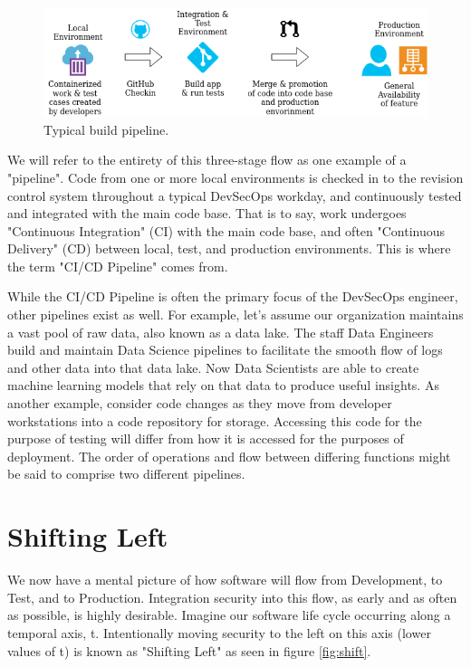 \begin{figure}[!htb]
	\centering
	\includegraphics[scale=0.63]{../images/flow.png}
	\caption{Typical build pipeline.}
	\label{fig:pipeline}
\end{figure}

\justify
We will refer to the entirety of this three-stage flow as one example of
a "pipeline". Code from one or more local environments is checked in to
the revision control system throughout a typical DevSecOps workday, and
continuously tested and integrated with the main code base. That is to
say, work undergoes "Continuous Integration" (CI) with the main code base, and often "Continuous Delivery" (CD) between local, test, and production environments. This is where the term "CI/CD Pipeline" comes from.

\justify
While the CI/CD Pipeline is often the primary focus of the DevSecOps engineer, other pipelines exist as well. For example, let's assume our organization maintains a vast pool of raw data, also known as a data
lake. The staff Data Engineers build and maintain Data Science pipelines
to facilitate the smooth flow of logs and other data into that data lake. Now Data Scientists are able to create machine learning models that rely on that data to produce useful insights. As another example,
consider code changes as they move from developer workstations into a code repository for storage. Accessing this code for the purpose of testing will differ from how it is accessed for the purposes of
deployment. The order of operations and flow between differing functions might be said to comprise two different pipelines.

\section{Shifting Left}

\justify
We now have a mental picture of how software will flow from Development, to Test, and to Production. Integration security into this flow, as early and as often as possible, is highly desirable. Imagine our software life cycle occurring along a temporal axis, t. Intentionally moving security to the left on this axis (lower values of t) is known as "Shifting Left" as seen in figure \ref{fig:shift}.

